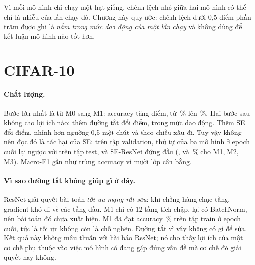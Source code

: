 Vì mỗi mô hình chỉ chạy một hạt giống, chênh lệch nhỏ giữa hai mô hình có thể chỉ là nhiễu của lần chạy đó. Chương này
quy ước: chênh lệch dưới 0,5 điểm phần trăm được ghi là \emph{nằm trong mức dao động của một lần chạy} và không dùng để
kết luận mô hình nào tốt hơn.

\section{CIFAR-10}

\begin{table}[H]
  \centering
  \caption{Kết quả trên tập test CIFAR-10 ( ảnh). In đậm: accuracy cao nhất}
  \label{tab:kqcifar10}
  \small
\end{table}

\paragraph{Chất lượng.} Bước lớn nhất là từ M0 sang M1: accuracy tăng  điểm, từ
\,\% lên \,\%. Hai bước sau không cho lợi ích nào: thêm đường tắt
đổi  điểm, trong mức dao động. Thêm SE đổi 
điểm, nhỉnh hơn ngưỡng 0,5 một chút và theo chiều xấu đi. Tuy vậy không nên đọc đó là tác hại của SE: trên tập validation,
thứ tự của ba mô hình ở epoch cuối lại ngược với trên tập test, và SE-ResNet đứng đầu (,  và
\,\% cho M1, M2, M3). Macro-F1 gần như trùng accuracy vì mười lớp cân bằng.

\paragraph{Vì sao đường tắt không giúp gì ở đây.} ResNet giải quyết bài toán \emph{tối ưu mạng rất sâu}: khi chồng hàng
chục tầng, gradient khó đi về các tầng đầu. M1 chỉ có 12 tầng tích chập, lại có BatchNorm, nên bài toán đó chưa xuất hiện.
M1 đã đạt accuracy \,\% trên tập train ở epoch cuối, tức là tối ưu không còn là
chỗ nghẽn. Đường tắt vì vậy không có gì để sửa. Kết quả này không mâu thuẫn với bài báo ResNet; nó cho thấy lợi ích của
một cơ chế phụ thuộc vào việc mô hình có đang gặp đúng vấn đề mà cơ chế đó giải quyết hay không.

